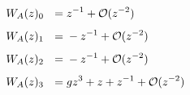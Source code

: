 \begin{sheetasymptotics}
    \begin{align*}
        \sheetlabel{W_A(z)_{0}} & ={}z^{-1}+\mathcal O(z^{-2}) \\[4pt]
        \sheetlabel{W_A(z)_{1}} & ={}-z^{-1}+\mathcal O(z^{-2}) \\[4pt]
        \sheetlabel{W_A(z)_{2}} & ={}-z^{-1}+\mathcal O(z^{-2}) \\[4pt]
        \sheetlabel{W_A(z)_{3}} & ={}gz^{3}+z+z^{-1}+\mathcal O(z^{-2})
    \end{align*}
\end{sheetasymptotics}
